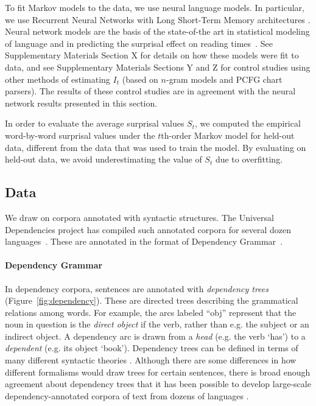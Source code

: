 To fit Markov models to the data, we use neural language models. In particular, we use Recurrent Neural Networks with Long Short-Term Memory architectures \citep{hochreiter-long-1997}. 
Neural network models are the basis of the state-of-the art in statistical modeling of language and in predicting the surprisal effect on reading times~\citep{frank-insensitivity-2011,goodkind-predictive-2018}.
See Supplementary Materials Section X for details on how these models were fit to data, and see Supplementary Materials Sections Y and Z for control studies using other methods of estimating $I_t$ (based on $n$-gram models and PCFG chart parsers). The results of these control studies are in agreement with the neural network results presented in this section.

In order to evaluate the average surprisal values $S_t$, we computed the empirical word-by-word surprisal values under the $t$th-order Markov model for held-out data, different from the data that was used to train the model. By evaluating on held-out data, we avoid underestimating the value of $S_t$ due to overfitting.




\subsection{Data}
We draw on corpora annotated with syntactic structures.
The Universal Dependencies project has compiled such annotated corpora for several dozen languages~\citep{nivre-universal-2017}.
These are annotated in the format of Dependency Grammar~\citep{hays1964dependency,hudson1984word,melcuk1988dependency,corbett1993heads,tesniere2015elements}.

\paragraph{Dependency Grammar}
In dependency corpora, sentences are annotated with \emph{dependency trees} (Figure~\ref{fig:dependency}).
These are directed trees describing the grammatical relations among words. For example, the arcs labeled ``obj'' represent that the noun in question is the \emph{direct object} if the verb, rather than e.g. the subject or an indirect object.
A dependency arc is drawn from a \emph{head} (e.g. the verb `has') to a \emph{dependent} (e.g. its object `book').
Dependency trees can be defined in terms of many different syntactic theories \citep{corbett1993heads}.
Although there are some differences in how different formalisms would draw trees for certain sentences, there is broad enough agreement about dependency trees that it has been possible to develop large-scale dependency-annotated corpora of text from dozens of languages \citep{nivre2017universal}.

